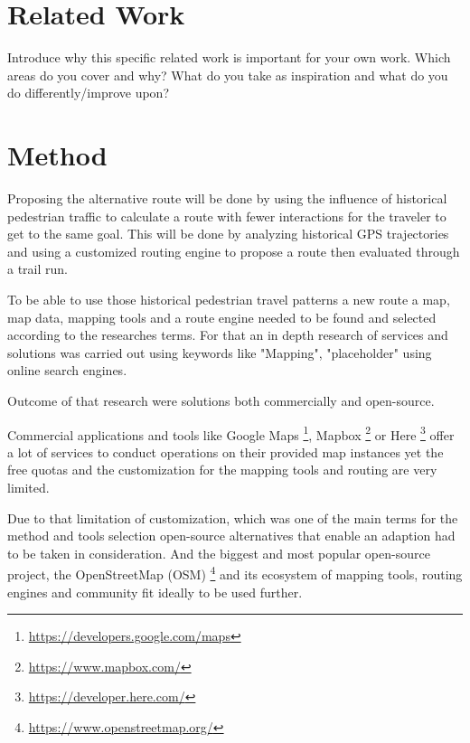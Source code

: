 \section{Related Work}
Introduce why this specific related work is important for your own work. Which areas do you cover and why? What do you take as inspiration and what do you do differently/improve upon? 

\autocite[]{Sevtsuk2021}

\autocite[]{Delling2012}
\autocite[]{Hashemi2017}
\autocite[]{Qiu2015}
\autocite[]{Hendawi2019}
\autocite[]{Huber2016}

\autocite[]{Zhang2012}

\section{Method}

Proposing the alternative route will be done by using the influence of historical pedestrian traffic to calculate a route with fewer interactions for the traveler to get to the same goal. This will be done by analyzing historical GPS trajectories and using a customized routing engine to propose a route then evaluated through a trail run. 

To be able to use those historical pedestrian travel patterns a new route a map, map data, mapping tools and a route engine needed to be found and selected according to the researches terms. For that an in depth research of services and solutions was carried out using keywords like "Mapping", "placeholder" using online search engines.

Outcome of that research were solutions both commercially and open-source.

Commercial applications and tools like Google Maps \footnote{\url{https://developers.google.com/maps}}, Mapbox \footnote{\url{https://www.mapbox.com/}} or Here \footnote{\url{https://developer.here.com/}} offer a lot of services to conduct operations on their provided map instances yet the free quotas and the customization for the mapping tools and routing are very limited. 

Due to that limitation of customization, which was one of the main terms for the method and tools selection open-source alternatives that enable an adaption had to be taken in consideration. And the biggest and most popular open-source project, the OpenStreetMap (OSM) \footnote{\url{https://www.openstreetmap.org/}} and its ecosystem of mapping tools, routing engines and community fit ideally to be used further. 

